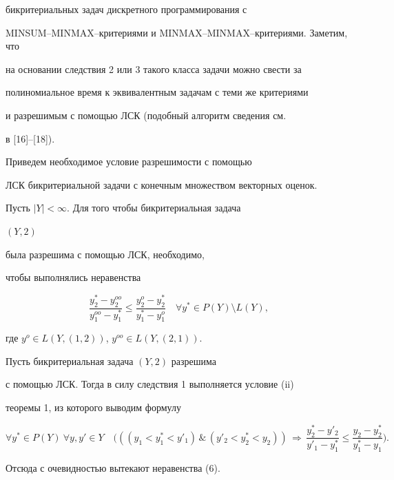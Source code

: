 бикритериальных задач дискретного программирования с  


MINSUM--MINMAX--критериями и MINMAX--MINMAX--критериями. Заметим, что 


на основании следствия 2 или 3 такого класса задачи можно свести за 


полиномиальное время к эквивалентным задачам с теми же критериями 


и разрешимым с помощью ЛСК (подобный алгоритм сведения см. 


в [16]--[18]). 


 


Приведем необходимое условие разрешимости с помощью 


ЛСК бикритериальной задачи с конечным множеством векторных оценок. 


 


\begin{cor} Пусть $|Y|<\infty$. Для того чтобы бикритериальная задача 


$(Y,2)$ 


была разрешима с помощью ЛСК, необходимо, 


чтобы выполнялись неравенства 


\begin{equation} 


\frac{y^*_2-y^{oo}_2}{y^{oo}_1-y^*_1}\le 


\frac{y^o_2-y^*_2}{y^*_1-y^o_1}\quad\forall y^*\in P(Y)\setminus L(Y), 


\end{equation} 


где $y^o\in L(Y,(1,2))$, $y^{oo}\in L(Y,(2,1))$. 


\end{cor} 


 


\begin{pf} Пусть бикритериальная задача $(Y,2)$ разрешима 


с помощью ЛСК. Тогда в силу следствия 1 выполняется условие (ii) 


теоремы 1, из которого выводим формулу 


$$ 


\forall y^*\in P(Y)\ \forall y,y'\in Y\quad 


\bigg(((y_1<y^*_1<y'_1)\,\&\,(y'_2<y^*_2<y_2))\, 


\Longrightarrow\,\frac{y^*_2-y'_2}{y'_1-y^*_1}\le


\frac{y_2-y^*_2}{y^*_1-y_1}\bigg). 


$$ 


Отсюда с очевидностью вытекают неравенства (6). 


\end{pf} 


